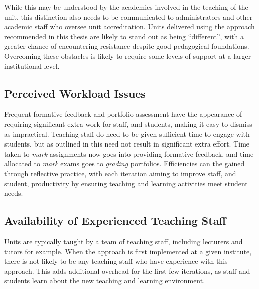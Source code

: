 While this may be understood by the academics involved in the teaching of the unit, this distinction also needs to be communicated to administrators and other academic staff who oversee unit accreditation. Units delivered using the approach recommended in this thesis are likely to stand out as being ``different'', with a greater chance of encountering resistance despite good pedagogical foundations. Overcoming these obstacles is likely to require some levels of support at a larger institutional level. 


\subsection{Perceived Workload Issues} %
\label{sub:perceived_workload_issues}

Frequent formative feedback and portfolio assessment have the appearance of requiring significant extra work for staff, and students, making it easy to dismiss as impractical. Teaching staff do need to be given sufficient time to engage with students, but as outlined in  this need not result in significant extra effort. Time taken to \emph{mark} assignments now goes into providing formative feedback, and time allocated to \emph{mark} exams goes to \emph{grading} portfolios. Efficiencies can the gained through reflective practice, with each iteration aiming to improve staff, and student, productivity by ensuring teaching and learning activities meet student needs.


\clearpage
\subsection{Availability of Experienced Teaching Staff} %
\label{sub:availability_of_teaching_staff}

Units are typically taught by a team of teaching staff, including lecturers and tutors for example. When the approach is first implemented at a given institute, there is not likely to be any teaching staff who have experience with this approach. This adds additional overhead for the first few iterations, as staff and students learn about the new teaching and learning environment.




